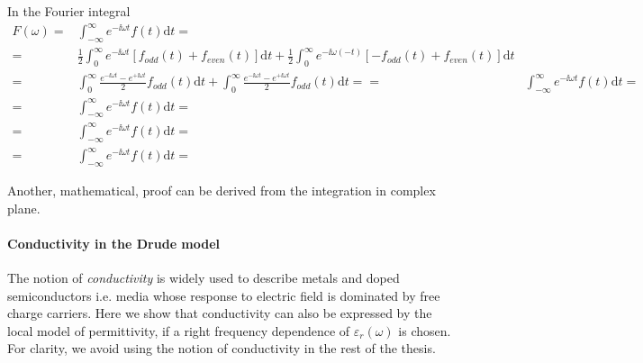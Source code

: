 \documentclass[letterpaper,12pt]{report}
\begin{document}
In the Fourier integral
\begin{equation} 
\begin{split} 
F(\omega)=& \int_{-\infty}^{\infty} e^{-\ii \omega t} f(t) \mbox{d}t = \\
		 =&  \frac{1}{2} \int_{0}^{\infty} e^{-\ii \omega   t } [ f_{odd}(t) + f_{even}(t)] \mbox{d}t 
		   + \frac{1}{2} \int_{0}^{\infty} e^{-\ii \omega (-t)} [-f_{odd}(t) + f_{even}(t)] \mbox{d}t  \\
		 =&  \int_{0}^{\infty} \frac{e^{-\ii \omega t}-e^{+\ii \omega t}}{2} f_{odd}(t) \mbox{d}t 
		   + \int_{0}^{\infty} \frac{e^{-\ii \omega t}-e^{+\ii \omega t}}{2} f_{odd}(t) \mbox{d}t  = 
		 =&\int_{-\infty}^{\infty} e^{-\ii \omega t} f(t) \mbox{d}t  = \\
		 =&\int_{-\infty}^{\infty} e^{-\ii \omega t} f(t) \mbox{d}t  = \\
		 =&\int_{-\infty}^{\infty} e^{-\ii \omega t} f(t) \mbox{d}t  = \\
		 =&\int_{-\infty}^{\infty} e^{-\ii \omega t} f(t) \mbox{d}t  = 
\end{split} 
\label{eq_}\end{equation}

Another, mathematical, proof can be derived from the integration in complex plane.


\paragraph{Conductivity in the Drude model}
The notion of \textit{conductivity} is widely used to describe metals and doped semiconductors i.e. media whose response to electric field is dominated by free charge carriers. Here we show that conductivity can also be expressed by the local model of permittivity, if a right frequency dependence of $\varepsilon_r(\omega)$ is chosen. For clarity, we avoid using the notion of conductivity in the rest of the thesis.
\end{document}
